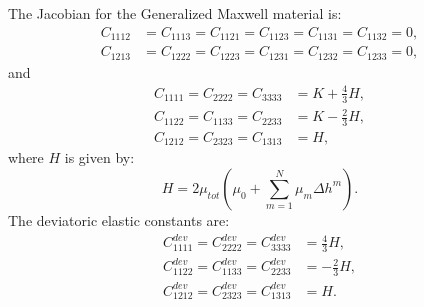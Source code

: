 The Jacobian for the Generalized Maxwell material is:
\begin{align}
  C_{1112} &= C_{1113} = C_{1121} = C_{1123} = C_{1131} = C_{1132} = 0,\\
  C_{1213} &= C_{1222} = C_{1223} = C_{1231} = C_{1232} = C_{1233} = 0,
\end{align}
and
\begin{align}
  C_{1111} = C_{2222} = C_{3333} &= K + \frac{4}{3} H, \\
  C_{1122} = C_{1133} = C_{2233} &= K - \frac{2}{3} H, \\
  C_{1212} = C_{2323} = C_{1313} &= H,
\end{align}
where $H$ is given by:
\begin{equation}
  H=2\mu_{tot}\left(\mu_{0}+\sum_{m=1}^{N}\mu_{m}{\Delta}h^{m}\right).
\end{equation}
The deviatoric elastic constants are:
\begin{align}
  C^\mathit{dev}_{1111} = C^\mathit{dev}_{2222} = C^\mathit{dev}_{3333} &= \frac{4}{3}H, \\
  C^\mathit{dev}_{1122} = C^\mathit{dev}_{1133} = C^\mathit{dev}_{2233} &= -\frac{2}{3}H, \\
  C^\mathit{dev}_{1212} = C^\mathit{dev}_{2323} = C^\mathit{dev}_{1313} &= H.
\end{align}


